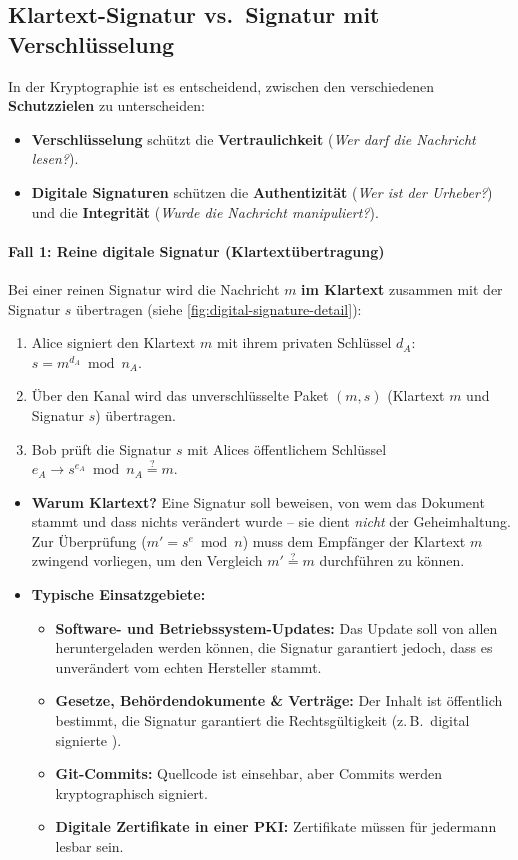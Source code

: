 \subsection*{Klartext-Signatur vs.\ Signatur mit Verschlüsselung}
In der Kryptographie ist es entscheidend, zwischen den verschiedenen \textbf{Schutzzielen} zu unterscheiden:
\begin{itemize}
	\item \textbf{Verschlüsselung} schützt die \textbf{Vertraulichkeit} (\emph{Wer darf die Nachricht lesen?}).
	\item \textbf{Digitale Signaturen} schützen die \textbf{Authentizität} (\emph{Wer ist der Urheber?}) und die \textbf{Integrität} (\emph{Wurde die Nachricht manipuliert?}).
\end{itemize}

\paragraph*{Fall 1: Reine digitale Signatur (Klartextübertragung)}
Bei einer reinen Signatur wird die Nachricht $m$ \textbf{im Klartext} zusammen mit der Signatur $s$ übertragen (siehe \cref{fig:digital-signature-detail}):
\begin{enumerate}
	\item Alice signiert den Klartext $m$ mit ihrem privaten Schlüssel $d_A$: $s = m^{d_A} \bmod n_A$.
	\item Über den Kanal wird das unverschlüsselte Paket $(m, s)$ (Klartext $m$ und Signatur $s$) übertragen.
	\item Bob prüft die Signatur $s$ mit Alices öffentlichem Schlüssel $e_A \rightarrow s^{e_A} \bmod n_A \stackrel{?}{=} m$.
\end{enumerate}
\begin{itemize}
	\item \textbf{Warum Klartext?} Eine Signatur soll beweisen, von wem das Dokument stammt und dass nichts verändert wurde -- sie dient \emph{nicht} der Geheimhaltung. Zur Überprüfung ($m' = s^e \bmod n$) muss dem Empfänger der Klartext $m$ zwingend vorliegen, um den Vergleich $m' \stackrel{?}{=} m$ durchführen zu können.
	\item \textbf{Typische Einsatzgebiete:}
	      \begin{itemize}
		      \item \textbf{Software- und Betriebssystem-Updates:} Das Update soll von allen heruntergeladen werden können, die Signatur garantiert jedoch, dass es unverändert vom echten Hersteller stammt.
		      \item \textbf{Gesetze, Behördendokumente \& Verträge:} Der Inhalt ist öffentlich bestimmt, die Signatur garantiert die Rechtsgültigkeit (z.\,B.\ digital signierte ).
		      \item \textbf{Git-Commits:} Quellcode ist einsehbar, aber Commits werden kryptographisch signiert.
		      \item \textbf{Digitale Zertifikate in einer \gls{PKI}:} Zertifikate müssen für jedermann lesbar sein.
	      \end{itemize}
\end{itemize}

